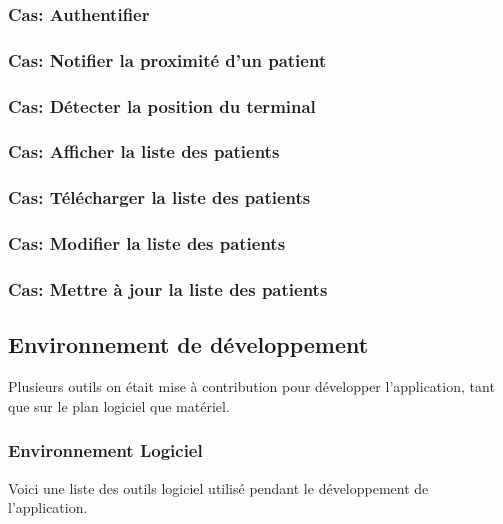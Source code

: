 \subsubsection{Cas: Authentifier}
\subsubsection{Cas: Notifier la proximité d'un patient}
\subsubsection{Cas: Détecter la position du terminal}
\subsubsection{Cas: Afficher la liste des patients}
\subsubsection{Cas: Télécharger la liste des patients}
\subsubsection{Cas: Modifier la liste des patients}
\subsubsection{Cas: Mettre à jour la liste des patients}

\subsection{Environnement de développement}%
Plusieurs outils on était mise à contribution pour développer l'application, tant que sur le plan logiciel que matériel.

\subsubsection{Environnement Logiciel}
Voici une liste des outils logiciel utilisé pendant le développement de l'application.

